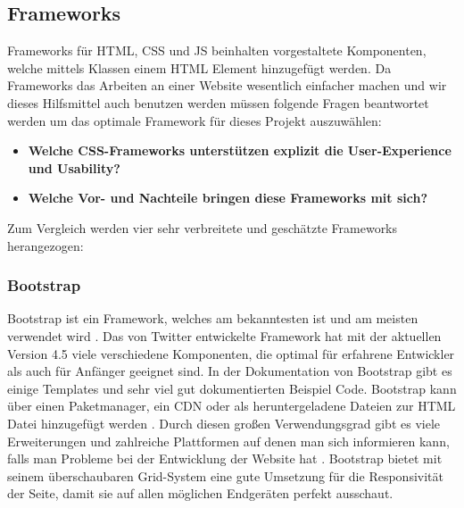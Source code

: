 	
	
	\subsection{Frameworks}
	Frameworks für HTML, CSS und JS beinhalten vorgestaltete Komponenten, welche mittels Klassen einem HTML Element hinzugefügt werden. Da Frameworks das Arbeiten an einer Website wesentlich einfacher machen und wir dieses Hilfsmittel auch benutzen werden müssen folgende Fragen beantwortet werden um das optimale Framework für dieses Projekt auszuwählen:
	\begin{itemize}
		\item \textbf{Welche CSS-Frameworks unterstützen explizit die User-Experience und Usability?}
		\item \textbf{Welche Vor- und Nachteile bringen diese Frameworks mit sich?}
	\end{itemize}
	Zum Vergleich werden vier sehr verbreitete und geschätzte Frameworks herangezogen:
		\subsubsection{Bootstrap}
		Bootstrap ist ein Framework, welches am bekanntesten ist und am meisten verwendet wird \cite{introduction-bootstrap, learning-bootstrap}. Das von Twitter entwickelte Framework hat mit der aktuellen Version 4.5 viele verschiedene Komponenten, die optimal für erfahrene Entwickler als auch für Anfänger geeignet sind. In der Dokumentation von Bootstrap gibt es einige Templates und sehr viel gut dokumentierten Beispiel Code\cite{introduction-bootstrap}. Bootstrap kann über einen Paketmanager, ein CDN oder als heruntergeladene Dateien zur HTML Datei hinzugefügt werden \cite{bootstrap-docu}. Durch diesen großen Verwendungsgrad gibt es viele Erweiterungen und zahlreiche Plattformen auf denen man sich informieren kann, falls man Probleme bei der Entwicklung der Website hat \cite{learning-bootstrap}. Bootstrap bietet mit seinem überschaubaren Grid-System eine gute Umsetzung für die Responsivität der Seite, damit sie auf allen möglichen Endgeräten perfekt ausschaut.
